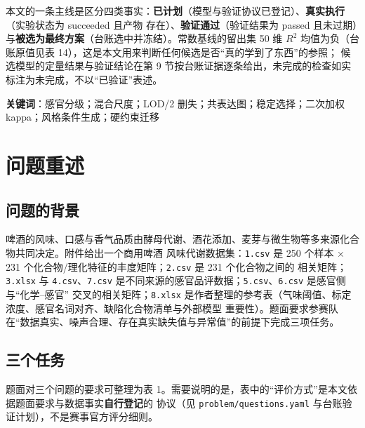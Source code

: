\documentclass[
  a4paper,12pt]{article}
\begin{document}
本文的一条主线是区分四类事实：\textbf{已计划}（模型与验证协议已登记）、\textbf{真实执行}（实验状态为
succeeded 且产物 存在）、\textbf{验证通过}（验证结果为 passed
且未过期）与\textbf{被选为最终方案}（台账选中并冻结）。常数基线的留出集
50 维 \(R^2\) 均值为负（台账原值见表
14），这是本文用来判断任何候选是否``真的学到了东西''的参照；
候选模型的定量结果与验证结论在第 9
节按台账证据逐条给出，未完成的检查如实标注为未完成，不以``已验证''表述。

\textbf{关键词}：感官分级；混合尺度；LOD/2
删失；共表达图；稳定选择；二次加权 kappa；风格条件生成；硬约束迁移

\section{问题重述}\label{ux95eeux9898ux91cdux8ff0}

\subsection{问题的背景}\label{ux95eeux9898ux7684ux80ccux666f}

啤酒的风味、口感与香气品质由酵母代谢、酒花添加、麦芽与微生物等多来源化合物共同决定。附件给出一个商用啤酒
风味代谢数据集：\texttt{1.csv} 是 250 个样本 × 231
个化合物/理化特征的丰度矩阵；\texttt{2.csv} 是 231 个化合物之间的
相关矩阵；\texttt{3.xlsx} 与 \texttt{4.csv}、\texttt{7.csv}
是不同来源的感官品评数据；\texttt{5.csv}、\texttt{6.csv}
是感官侧与``化学--感官'' 交叉的相关矩阵；\texttt{8.xlsx}
是作者整理的参考表（气味阈值、标定浓度、感官名词对齐、缺陷化合物清单与外部模型
重要性）。题面要求参赛队在``数据真实、噪声合理、存在真实缺失值与异常值''的前提下完成三项任务。

\subsection{三个任务}\label{ux4e09ux4e2aux4efbux52a1}

题面对三个问题的要求可整理为表
1。需要说明的是，表中的``评价方式''是本文依据题面要求与数据事实\textbf{自行登记}的
协议（见 \texttt{problem/questions.yaml}
与台账验证计划），不是赛事官方评分细则。
\end{document}
